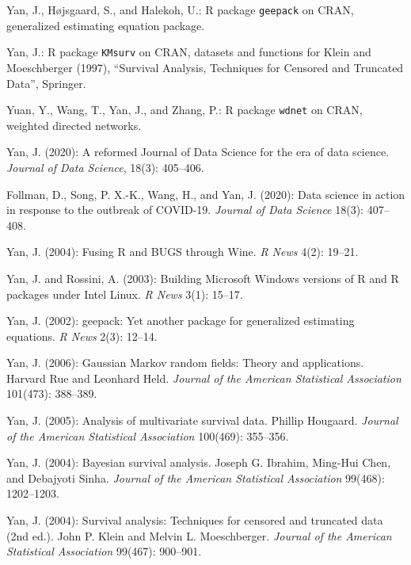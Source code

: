 \documentclass[Statistics]{vita}
\begin{document}
\begin{vita}
\begin{Publications}
\begin{Software}
  \item Yan, J., H\o{}jsgaard, S., and Halekoh, U.: R package \texttt{geepack} on CRAN, generalized estimating equation package.
  \item Yan, J.: R package \texttt{KMsurv} on CRAN,  datasets and functions for Klein and Moeschberger (1997), ``Survival Analysis, Techniques for Censored and Truncated Data'', Springer.
  \item *Yuan, Y., Wang, T., Yan, J., and Zhang, P.: R package \texttt{wdnet} on CRAN, weighted directed networks.
  \end{Software}
  \begin{NonRefereedPublications}
  \item Yan, J. (2020): A reformed Journal of Data Science for the era of data science. {\em Journal of Data Science\/}, 18(3): 405--406.
  \item Follman, D., Song, P. X.-K., Wang, H., and Yan, J. (2020): Data science in action in response to the outbreak of COVID-19. {\em Journal of Data Science\/} 18(3): 407--408.
  \item Yan, J. (2004): Fusing {R} and {BUGS} through {Wine}. {\em R News\/} 4(2): 19--21.
  \item Yan, J. and Rossini, A. (2003): Building {M}icrosoft {W}indows versions of {R} and {R} packages under {I}ntel {L}inux. {\em R News\/} 3(1): 15--17.
  \item Yan, J. (2002): geepack: Yet another package for generalized estimating equations. {\em R News\/} 2(3): 12--14.
  \end{NonRefereedPublications}
  \begin{BookReviews}
  \item Yan, J. (2006): Gaussian Markov random fields: Theory and applications. {H}arvard {R}ue and {L}eonhard {H}eld. {\em Journal of the American Statistical Association\/} 101(473): 388--389.
  \item Yan, J. (2005): Analysis of multivariate survival data. {P}hillip {H}ougaard. {\em Journal of the American Statistical Association\/} 100(469): 355--356.
  \item Yan, J. (2004): Bayesian survival analysis. {J}oseph {G}. {I}brahim, {M}ing-{H}ui {C}hen, and {D}ebajyoti {S}inha. {\em Journal of the American Statistical Association\/} 99(468): 1202--1203.
  \item Yan, J. (2004): Survival analysis: Techniques for censored and truncated data (2nd ed.). {J}ohn {P}. {K}lein and {M}elvin {L}. {M}oeschberger. {\em Journal of the American Statistical Association\/} 99(467): 900--901.

\end{BookReviews}
\end{Publications}
\end{vita}
\end{document}
